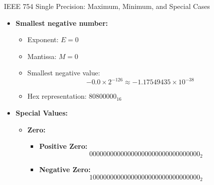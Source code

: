 \documentclass[aspectratio=169]{beamer}
\begin{document}
\begin{frame}[allowframebreaks]{IEEE 754 Single Precision: Maximum, Minimum, and Special Cases}
\begin{itemize}
        \item \textbf{Smallest negative number:}
        \begin{itemize}
            \item Exponent: \( E = 0 \) 
            \item Mantissa: \( M = 0 \)
            \item Smallest negative value:
            \[
            -0.0 \times 2^{-126} \approx -1.17549435 \times 10^{-38}
            \]
            \item Hex representation: \( 80800000_{16} \)
        \end{itemize}

        \framebreak

        \item \textbf{Special Values:}


        \begin{itemize}
            \item \textbf{Zero:}
            \begin{itemize}
                \item \textbf{Positive Zero:} 
                \[
                00000000000000000000000000000000_2
                \]
                \item \textbf{Negative Zero:} 
                \[
                10000000000000000000000000000000_2
                \]
            \end{itemize}
                

\end{itemize}
\end{itemize}
\end{frame}
\end{document}
